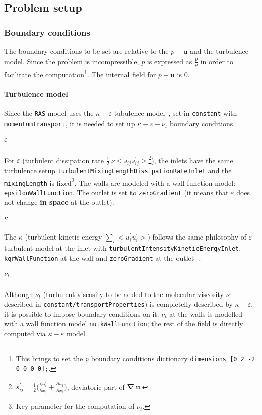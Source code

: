 \subsection{Problem setup}
\subsubsection{Boundary conditions}
The boundary conditions to be set are relative to the $p-\boldsymbol{u}$ and the turbulence model. Since the problem is incompressible, $p$ is expressed as $\frac{p}{\rho}$ in order to facilitate the computation\cprotect\footnote{This brings to set the \verb|p| boundary conditions dictionary \verb|dimensions [0 2 -2 0 0 0 0];|.}. The internal field for $p-\boldsymbol{u}$ is $0$. 

\paragraph{Turbulence model}
Since the \verb|RAS| model uses the $\kappa-\varepsilon$ tubulence model~\cite[Ch. 10.4]{pope2000turbulent}, set in \verb|constant| with \verb|momentumTransport|, it is needed to set up $\kappa-\varepsilon-\nu_t$ boundary conditions. 

\subparagraph{$\varepsilon$} For $\varepsilon$ (turbulent dissipation rate $\frac{1}{2} \ \nu < s_{ij}^{\prime} s_{ij}^{\prime} >$\footnote{$s_{ij}^{\prime} = \frac{1}{2} \big( \frac{\partial u_i^{\prime}}{\partial x_j}  + \frac{\partial u_j^{\prime}}{\partial x_i} \big)$, deviatoric part of $\boldsymbol{\nabla \ u}^{\prime} $}), the inlets have the same turbulence setup \verb|turbulentMixingLengthDissipationRateInlet| and the \verb|mixingLength| is fixed\footnote{Key parameter for the computation of $\nu_t$.}. The walls are modeled with a wall function model: \verb|epsilonWallFunction|. The outlet is set to \verb|zeroGradient| (it means that $\varepsilon$ does not change \textbf{in space} at the outlet). 

\subparagraph{$\kappa$} The $\kappa$ (turbulent kinetic energy $\sum_i < u_i^{\prime} u_i^{\prime} >$) follows the same philosophy of $\varepsilon$ - turbulent model at the inlet with \verb|turbulentIntensityKineticEnergyInlet|, \verb|kqrWallFunction| at the wall and \verb|zeroGradient| at the outlet -.

\subparagraph{$\nu_t$} Although $\nu_t$ (turbulent viscosity to be added to the molecular viscosity $\nu$ described in \verb|constant/transportProperties|) is completelly described by $\kappa-\varepsilon$, it is possible to impose boundary conditions on it. $\nu_t$ at the walls is modelled with a wall function model \verb|nutkWallFunction|; the rest of the field is directly computed via $\kappa-\varepsilon$ model.  

